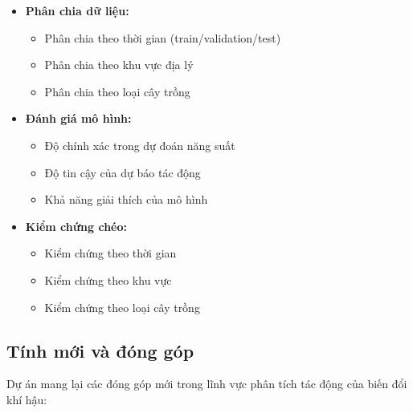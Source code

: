 \begin{itemize}
    \item \textbf{Phân chia dữ liệu:}
    \begin{itemize}
        \item Phân chia theo thời gian (train/validation/test)
        \item Phân chia theo khu vực địa lý
        \item Phân chia theo loại cây trồng
    \end{itemize}
    
    \item \textbf{Đánh giá mô hình:}
    \begin{itemize}
        \item Độ chính xác trong dự đoán năng suất
        \item Độ tin cậy của dự báo tác động
        \item Khả năng giải thích của mô hình
    \end{itemize}
    
    \item \textbf{Kiểm chứng chéo:}
    \begin{itemize}
        \item Kiểm chứng theo thời gian
        \item Kiểm chứng theo khu vực
        \item Kiểm chứng theo loại cây trồng
    \end{itemize}
\end{itemize}

\subsection{Tính mới và đóng góp}

\hspace{0.5cm}Dự án mang lại các đóng góp mới trong lĩnh vực phân tích tác động của biến đổi khí hậu:

